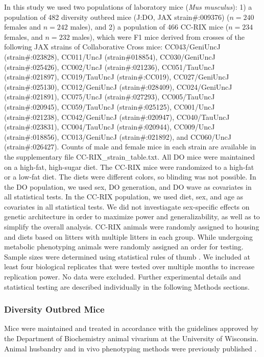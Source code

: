 \documentclass[
]{article}
\begin{document}
In this study we used two populations of laboratory mice
(\textit{Mus musculus}): 1) a population of 482 diversity outbred mice
(J:DO, JAX strain\#:009376) (\(n = 240\) females and \(n = 242\) males),
and 2) a population of 466 CC-RIX mice (\(n = 234\) females, and
\(n = 232\) males), which were F1 mice derived from crosses of the
following JAX strains of Collaborative Cross mice: CC043/GeniUncJ
(strain\#:023828), CC011/UncJ (strain\#018854), CC030/GeniUncJ
(strain\#:025426), CC002/UncJ (strain\#:021236), CC051/TauUncJ
(strain\#:021897), CC019/TauUncJ (strain\#:CC019), CC027/GeniUncJ
(strain\#:025130), CC012/GeniUncJ (strain\#:028409), CC024/GeniUncJ
(strain\#:021891), CC075/UncJ (strain\#:027293), CC005/TauUncJ
(strain\#:020945), CC059/TauUncJ (strain\#:025125), CC001/UncJ
(strain\#:021238), CC042/GeniUncJ (strain\#:020947), CC040/TauUncJ
(strain\#:023831), CC004/TauUncJ (strain\#:020944), CC009/UncJ
(strain\#:018856), CC013/GeniUncJ (strain\#:021892), and CC060/UncJ
(strain\#:026427). Counts of male and female mice in each strain are
available in the supplementary file CC-RIX\_strain\_table.txt. All DO
mice were maintained on a high-fat, high-sugar diet. The CC-RIX mice
were randomized to a high-fat or a low-fat diet. The diets were
different colors, so blinding was not possible. In the DO population, we
used sex, DO generation, and DO wave as covariates in all statistical
tests. In the CC-RIX population, we used diet, sex, and age as
covariates in all statistical tests. We did not investiagate
sex-specific effects on genetic architecture in order to maximize power
and generalizability, as well as to simplify the overall analysis.
CC-RIX animals were randomly assigned to housing and diets based on
litters with multiple litters in each group. While undergoing metabolic
phenotyping animals were randomly assigned an order for testing. Sample
sizes were determined using statistical rules of thumb
\cite{van2011statistical}. We included at least four biological
replicates that were tested over multiple months to increase replication
power. No data were excluded. Further experimental details and
statistical testing are described individually in the following Methods
sections.

\subsubsection{Diversity Outbred Mice}\label{diversity-outbred-mice}

Mice were maintained and treated in accordance with the guidelines
approved by the Department of Biochemistry animal vivarium at the
University of Wisconsin. Animal husbandry and in vivo phenotyping
methods were previously published \cite{pmid31343992, pmid29567659}.
\end{document}
